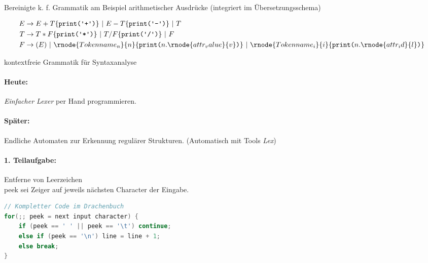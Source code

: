 \Bsp Bereinigte k. f. Grammatik am Beispiel arithmetischer Ausdrücke (integriert im Übersetzungsschema)
\newcommand{\print}[1]{\{\texttt{print(\textquotesingle#1\textquotesingle)}\}}
\newcommand{\printx}[1]{\{\texttt{print(}#1\texttt{)}\}}
\begin{center}
\begin{minipage}{0.7\linewidth}
\begin{align*}
 E &\to E + T\print{+}\ |\ E - T\print{-}\ |\ T \\
 T &\to T * F\print{*}\ |\ T / F\print{/}\ |\ F \\
 F &\to (E)\ |\ \rnode{Tokenname_n}{n}\printx{n.\rnode{attr_value}{v}}\ |\ \rnode{Tokenname_i}{i}\printx{n.\rnode{attr_id}{l}}
\end{align*}
{\footnotesize {} \hfill {} \hfill {} \hfill {}}
\end{minipage}
\vline\hfill
\begin{minipage}{0.25\linewidth}
 kontextfreie Grammatik für Syntaxanalyse
\end{minipage}
\end{center}
\paragraph{Heute:} \emph{Einfacher Lexer} per Hand programmieren.
\paragraph{Später:} Endliche Automaten zur Erkennung regulärer Strukturen. (Automatisch mit Tools \emph{Lex})

\paragraph{1. Teilaufgabe:} Entferne von Leerzeichen\\
peek sei Zeiger auf jeweils nächsten Character der Eingabe.

\begin{lstlisting}[language=Java]
// Kompletter Code im Drachenbuch
for(;; peek = next input character) {
    if (peek == ' ' || peek == '\t') continue;
    else if (peek == '\n') line = line + 1;
    else break;
}
\end{lstlisting}

